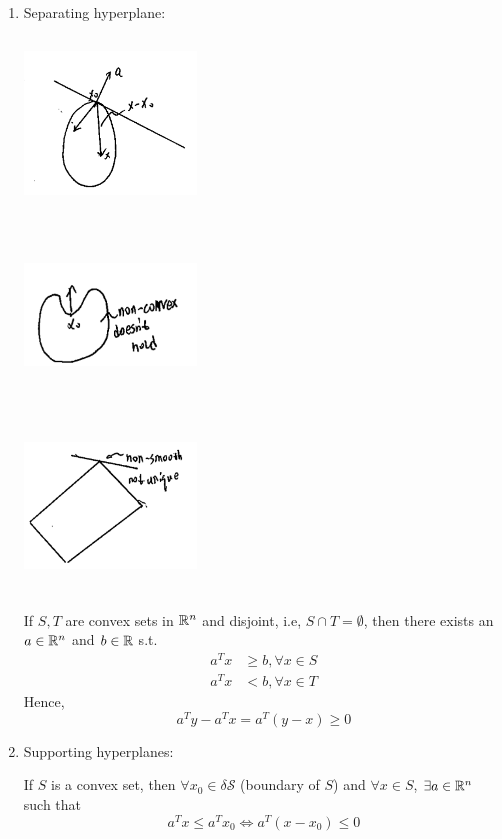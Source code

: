 \begin{enumerate}
	\item Separating hyperplane: 
	\begin{marginfigure}
		\centering
		\includegraphics[width=1.8in,height=1.8in]{figures/ch08/figure1030_3.png}
	\end{marginfigure}
	
	\begin{marginfigure}
		\centering
		\includegraphics[width=1.8in,height=1.8in]{figures/ch08/figure1030_4.png}
	\end{marginfigure}
	
	\begin{marginfigure}
		\centering
		\includegraphics[width=1.8in,height=1.8in]{figures/ch08/figure1030_5.png}
	\end{marginfigure}
	If $S,T$ are convex sets in $\mathbb{R}^n$ and disjoint, i.e, $S\cap T = \emptyset$, then there exists an $a \in \mathbb{R}^n$ and $b\in \mathbb{R}$ s.t.	
	\begin{align*}
	a^Tx&\geq b, \forall x\in S\\
	a^Tx &<b, \forall x\in T                              
	\end{align*}
	Hence,
	 $$a^Ty - a^T x = a^T(y-x) \geq 0$$
	

	\item Supporting hyperplanes:


	If $S$ is a convex set, then $\forall x_0\in \delta \mathcal{S}$ (boundary of $S$) and $\forall x\in S$, $\exists a\in \mathbb{R}^n$ such that 
	$$a^Tx \leq a^Tx_0\Leftrightarrow a^T(x - x_0)\leq 0$$

	
\end{enumerate}

